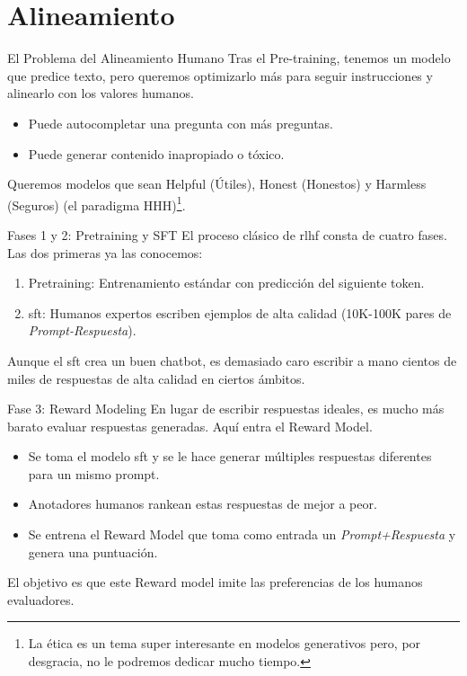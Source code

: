 \section{Alineamiento}

\begin{frame}{El Problema del Alineamiento Humano}
Tras el Pre-training, tenemos un modelo que predice texto, pero queremos optimizarlo más para seguir instrucciones y alinearlo con los valores humanos.

\begin{itemize}
    \item Puede autocompletar una pregunta con más preguntas.
    \item Puede generar contenido inapropiado o tóxico.
\end{itemize}

Queremos modelos que sean \alert{Helpful (Útiles)}, \alert{Honest (Honestos)} y \alert{Harmless (Seguros)} (el paradigma HHH)\footnote{La ética es un tema super interesante en modelos generativos pero, por desgracia, no le podremos dedicar mucho tiempo.}.
\end{frame}

\begin{frame}{Fases 1 y 2: Pretraining y SFT}
El proceso clásico de \alert{\gls{rlhf}} consta de cuatro fases. Las dos primeras ya las conocemos:

\begin{enumerate}
    \item \alert{Pretraining:} Entrenamiento estándar con predicción del siguiente token.
    \item \alert{\acrfull{sft}:} Humanos expertos escriben ejemplos de alta calidad (10K-100K pares de \textit{Prompt-Respuesta}).
\end{enumerate}

Aunque el \gls{sft} crea un buen chatbot, es demasiado caro escribir a mano cientos de miles de respuestas de alta calidad en ciertos ámbitos.
\end{frame}

\begin{frame}{Fase 3: Reward Modeling}
En lugar de escribir respuestas ideales, es mucho más barato \alert{evaluar} respuestas generadas. Aquí entra el \alert{Reward Model}.

\begin{itemize}
    \item Se toma el modelo \gls{sft} y se le hace generar múltiples respuestas diferentes para un mismo prompt.
    \item Anotadores humanos \alert{rankean} estas respuestas de mejor a peor.
    \item Se entrena el Reward Model que toma como entrada un \textit{Prompt+Respuesta} y genera una \alert{puntuación}.
\end{itemize}
El objetivo es que este Reward model \alert{imite} las \alert{preferencias de los humanos} evaluadores.
\end{frame}

